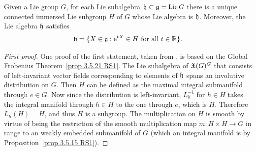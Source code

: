 \begin{thm}\label{thm analytic subgroup}
    Given a Lie group $G$, for each Lie subalgebra $\mathfrak{h}\subset \mathfrak{g}=\operatorname{Lie} G$ there is a unique connected immersed Lie subgroup $H$ of $G$ whose Lie algebra is $\mathfrak{h}$. Moreover, the Lie algebra $\mathfrak{h}$ satisfies
    \[\mathfrak{h}=\{X\in\mathfrak{g}: \mathrm{e}^{tX}\in H\text{ for all }t\in\mathbb{R}\}.\]
\end{thm}
\begin{proof}[First proof]
    One proof of the first statement, taken from \cite[Prop.~5.6.5]{RS1}, is based on the Global Frobenius Theorem~\ref{prop 3.5.21 RS1}. The Lie subalgebra of $\mathfrak{X}(G)^G$ that consists of left-invariant vector fields corresponding to elements of $\mathfrak{h}$ spans an involutive distribution on $G$. Then $H$ can be defined as the maximal integral submanifold through $e\in G$. Now since the distribution is left-invariant, $L_h^{-1}$ for $h\in H$ takes the integral manifold through $h\in H$ to the one through $e$, which is $H$. Therefore $L_h(H)=H$, and thus $H$ is a subgroup. The multiplication on $H$ is smooth by virtue of being the restriction of the smooth multiplication map $m:H\times H\to G$ in range to an weakly embedded submanifold of $G$ (which an integral manifold is by Proposition~\ref{prop 3.5.15 RS1}).
\end{proof}
